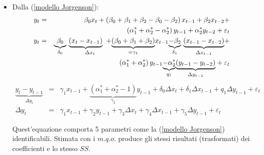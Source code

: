 \documentclass[a4paper]{report}
\newcounter{def}
\theoremstyle{remark}
\begin{document}
\begin{itemize}
\item Dalla (\ref{modello Jorgenson}):%
\begin{eqnarray*}
y_{t} &=&\beta _{0}x_{t}+\left( \beta _{0}+\beta _{1}+\beta _{2}-\beta
_{0}-\beta _{2}\right) x_{t-1}+\beta _{2}x_{t-2}+ \\
&&\left( \alpha _{1}^{\ast }+\alpha _{2}^{\ast }-\alpha _{2}^{\ast }\right)
y_{t-1}+\alpha _{2}^{\ast }y_{t-2}+\varepsilon _{t} \\
y_{t} &=&\underset{\delta _{0}}{\underbrace{\beta _{0}}}\ \underset{\Delta
x_{t}}{\underbrace{\left( x_{t}-x_{t-1}\right) }\ +}\underset{=\gamma _{1}}{%
\underbrace{\left( \beta _{0}+\beta _{1}+\beta _{2}\right) }}x_{t-1}\underset%
{\delta _{1}}{\underbrace{-\beta _{2}}}\ \underset{\Delta x_{t-1}}{%
\underbrace{\left( x_{t-1}-x_{t-2}\right) }}+ \\
&&\left( \alpha _{1}^{\ast }+\alpha _{2}^{\ast }\right) y_{t-1}\underset{%
q_{1}}{\underbrace{-\alpha _{2}^{\ast }}}\underset{\Delta y_{t-1}}{%
\underbrace{\left( y_{t-1}-y_{t-2}\right) }}+\varepsilon _{t}
\end{eqnarray*}%
\begin{eqnarray}
\underset{\Delta y_{t}}{\underbrace{y_{t}-y_{t-1}}} &=&\gamma _{1}x_{t-1}+%
\underset{\gamma _{2}}{\underbrace{\left( \alpha _{1}^{\ast }+\alpha
_{2}^{\ast }-1\right) }}y_{t-1}+\delta _{0}\Delta x_{t}+\delta _{1}\Delta
x_{t-1}+q_{1}\Delta y_{t-1}+\varepsilon _{t}  \label{modello ridefinito} \\
\Delta y_{t} &=&\gamma _{1}x_{t-1}+\gamma _{2}y_{t-1}+\gamma _{3}\Delta
x_{t}+\gamma _{4}\Delta x_{t-1}+\gamma _{5}\Delta y_{t-1}+\varepsilon _{t}
\end{eqnarray}

Quest'equazione comporta 5 parametri come la (\ref{modello Jorgenson})
identificabili. Stimata con i $m.q.o.$ produce gli stessi risultati
(trasformati) dei coefficienti e lo stesso $SS$.


\end{itemize}
\end{document}
